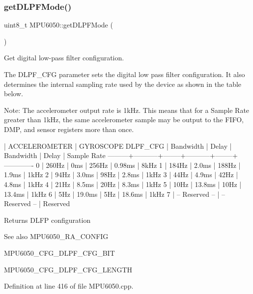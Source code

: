 \subsubsection{\texorpdfstring{getDLPFMode()}{getDLPFMode()}}
{\footnotesize\ttfamily uint8\+\_\+t M\+P\+U6050\+::get\+D\+L\+P\+F\+Mode (\begin{DoxyParamCaption}{ }\end{DoxyParamCaption})}



Get digital low-\/pass filter configuration. 

The D\+L\+P\+F\+\_\+\+C\+FG parameter sets the digital low pass filter configuration. It also determines the internal sampling rate used by the device as shown in the table below.

Note\+: The accelerometer output rate is 1k\+Hz. This means that for a Sample Rate greater than 1k\+Hz, the same accelerometer sample may be output to the F\+I\+FO, D\+MP, and sensor registers more than once.


\begin{DoxyPre}
         |   ACCELEROMETER    |           GYROSCOPE
DLPF\_CFG | Bandwidth | Delay  | Bandwidth | Delay  | Sample Rate
---------+-----------+--------+-----------+--------+-------------
0        | 260Hz     | 0ms    | 256Hz     | 0.98ms | 8kHz
1        | 184Hz     | 2.0ms  | 188Hz     | 1.9ms  | 1kHz
2        | 94Hz      | 3.0ms  | 98Hz      | 2.8ms  | 1kHz
3        | 44Hz      | 4.9ms  | 42Hz      | 4.8ms  | 1kHz
4        | 21Hz      | 8.5ms  | 20Hz      | 8.3ms  | 1kHz
5        | 10Hz      | 13.8ms | 10Hz      | 13.4ms | 1kHz
6        | 5Hz       | 19.0ms | 5Hz       | 18.6ms | 1kHz
7        |   -- Reserved --   |   -- Reserved --   | Reserved
\end{DoxyPre}


\begin{DoxyReturn}{Returns}
D\+L\+FP configuration 
\end{DoxyReturn}
\begin{DoxySeeAlso}{See also}
M\+P\+U6050\+\_\+\+R\+A\+\_\+\+C\+O\+N\+F\+IG 

M\+P\+U6050\+\_\+\+C\+F\+G\+\_\+\+D\+L\+P\+F\+\_\+\+C\+F\+G\+\_\+\+B\+IT 

M\+P\+U6050\+\_\+\+C\+F\+G\+\_\+\+D\+L\+P\+F\+\_\+\+C\+F\+G\+\_\+\+L\+E\+N\+G\+TH 
\end{DoxySeeAlso}


Definition at line 416 of file M\+P\+U6050.\+cpp.

\mbox{\label{classMPU6050_a902a7d486cd6ac21f8c378634dc6f59a}} 
